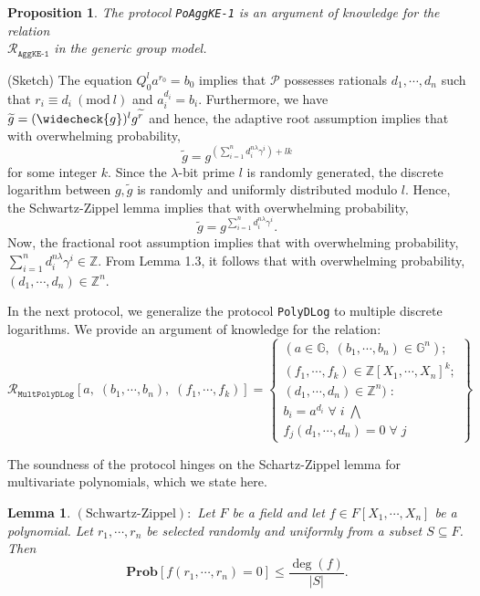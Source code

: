 \documentclass[11pt, lettersize, notitlepage, leqno, footskip=0.6cm]{article}
\newcommand{\bz}{\mathbb Z}
\newcommand{\slim}{\sum\limits}
\newcommand{\ttt}{\texttt}
\newcommand{\wti}{\widetilde}
\newcommand{\mc}{\mathcal}
\newcommand{\mb}{\mathbb}
\newcommand{\mbf}{\mathbf}
\newcommand{\mr}{\mathrm}
\newcommand{\lam}{\lambda}
\newcommand{\weck}{\widecheck}
\newcommand{\sub}{\subseteq}
\newcommand{\mP}{\mc{P}}
\newcommand{\vs}{\vspace{-0.15cm}}
\newcommand{\noin}{\noindent}
\newcommand{\op}{overwhelming probability}
\newcommand{\Mod}[1]{\ (\mathrm{mod}\ #1)}
\newtheorem{Prop}[Thm]{Proposition}
\newtheorem{Lem}[Thm]{Lemma}
\numberwithin{equation}{section}
\begin{document}
\vspace{0.2cm}

\begin{Prop} The protocol \verb|PoAggKE-1| is an argument of knowledge for the relation\\ $\mc{R}_{{\ttt{AggKE-1}}}$ in the generic group model.\end{Prop}

\begin{prf} (Sketch) The equation $Q_0^la^{r_0} = b_0$ implies that $\mP$ possesses rationals $d_1,\cdots,d_n$ such that $r_i\equiv d_i\Mod{l}$ and 
$a_i^{d_i} = b_i$. Furthermore, we have $\wti{g} = (\weck{g})^lg^{\wti{r}}$ and hence, the adaptive root assumption implies that with \op, \vs $$\wti{g} = g^{(\slim_{i=1}^n d_i^{n\lam}\gamma^i)+lk} $$ for some integer $k$. Since the $\lam$-bit prime $l$ is randomly generated, the discrete logarithm between $g,\wti{g}$ is randomly and uniformly distributed modulo $l$. Hence, the Schwartz-Zippel lemma implies that with \op, \vs $$\wti{g} = g^{\slim_{i=1}^n d_i^{n\lam}\gamma^i}.$$ Now, the fractional root assumption implies that with \op, $\slim_{i=1}^n d_i^{n\lam}\gamma^i\in\bz$. From Lemma 1.3, it follows that with \op, $(d_1,\cdots,d_n)\in\bz^n$.\end{prf}

\bigskip

In the next protocol, we generalize the protocol \verb|PolyDLog| to multiple discrete logarithms. We provide an argument of knowledge for the relation: 
\[
  \mc{R}_{\ttt{MultPolyDLog}}[a,\; (b_1,\cdots, b_n),\; (f_1,\cdots,f_k)] = \left\{\begin{array}{l}
    (a\in\mb{G},\; (b_1,\cdots, b_n)\in\mb{G}^n);\\
    (f_1,\cdots,f_k)\in\bz[X_1,\cdots,X_n]^k;\\ 
    (d_1,\cdots,d_n)\in\bz^n)\;: \\
    b_i = a^{d_i}\;\forall\; i\;\bigwedge \;\\   f_j(d_1,\cdots,d_n) = 0\;\forall\; j 
  \end{array}\right\}
\] 

\noin The soundness of the protocol hinges on the Schartz-Zippel lemma for multivariate polynomials, which we state here.

\begin{Lem} $\mr{(Schwartz\text{-}Zippel)}:$ Let $F$ be a field and let $f\in F[X_1,\cdots,X_n]$ be a polynomial. Let $r_1,\cdots,r_n$ be selected randomly and uniformly from a subset $S\sub F$. Then \vspace{-0.1cm}$$\mbf{Prob}[f(r_1,\cdots, r_n) = 0] \leq \frac{\deg(f)}{|S|}.$$\end{Lem}
\end{document}

